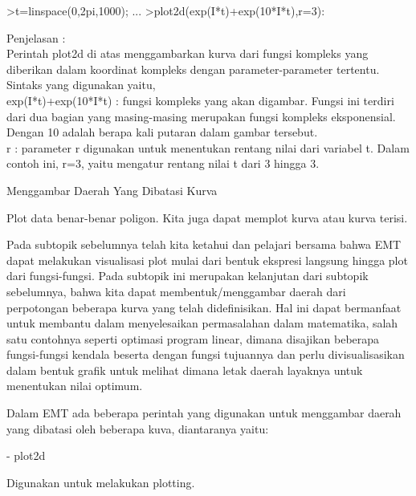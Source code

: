 \documentclass[a4paper,10pt]{article}
\begin{document}
\begin{eulernotebook}
\begin{eulercomment}
\begin{eulercomment}
\begin{eulercomment}
\begin{eulercomment}
\begin{eulercomment}
\begin{eulercomment}
\begin{eulercomment}
\begin{eulercomment}
\begin{eulercomment}
\begin{eulercomment}
\begin{eulerprompt}
>t=linspace(0,2pi,1000); ...
>plot2d(exp(I*t)+exp(10*I*t),r=3):
\end{eulerprompt}
\begin{eulercomment}
Penjelasan :\\
Perintah plot2d di atas menggambarkan kurva dari fungsi kompleks yang
diberikan dalam koordinat kompleks dengan parameter-parameter
tertentu.\\
Sintaks yang digunakan yaitu,\\
exp(I*t)+exp(10*I*t) : fungsi kompleks yang akan digambar. Fungsi ini
terdiri dari dua bagian yang masing-masing merupakan fungsi kompleks
eksponensial. Dengan 10 adalah berapa kali putaran dalam gambar
tersebut.\\
r : parameter r digunakan untuk menentukan rentang nilai dari variabel
t. Dalam contoh ini, r=3, yaitu mengatur rentang nilai t dari 3 hingga
3.

\begin{eulercomment}
\begin{eulercomment}
Menggambar Daerah Yang Dibatasi Kurva 


Plot data benar-benar poligon. Kita juga dapat memplot kurva atau
kurva terisi.

Pada subtopik sebelumnya telah kita ketahui dan pelajari bersama bahwa
EMT dapat melakukan visualisasi plot mulai dari bentuk ekspresi
langsung hingga plot dari fungsi-fungsi. Pada subtopik ini merupakan
kelanjutan dari subtopik sebelumnya, bahwa kita dapat
membentuk/menggambar daerah dari perpotongan beberapa kurva yang telah
didefinisikan. Hal ini dapat bermanfaat untuk membantu dalam
menyelesaikan permasalahan dalam matematika, salah satu contohnya
seperti optimasi program linear, dimana disajikan beberapa
fungsi-fungsi kendala beserta dengan fungsi tujuannya dan perlu
divisualisasikan dalam bentuk grafik untuk melihat dimana letak daerah
layaknya untuk menentukan nilai optimum.

Dalam EMT ada beberapa perintah yang digunakan untuk menggambar daerah
yang dibatasi oleh beberapa kuva, diantaranya yaitu:

- plot2d\\
\end{eulercomment}
\begin{eulerttcomment}
  Digunakan untuk melakukan plotting.
\end{eulerttcomment}
\begin{eulercomment}


\end{eulercomment}
\end{eulercomment}
\end{eulercomment}
\end{eulercomment}
\end{eulercomment}
\end{eulercomment}
\end{eulercomment}
\end{eulercomment}
\end{eulercomment}
\end{eulercomment}
\end{eulercomment}
\end{eulercomment}
\end{eulercomment}
\end{eulernotebook}
\end{document}
